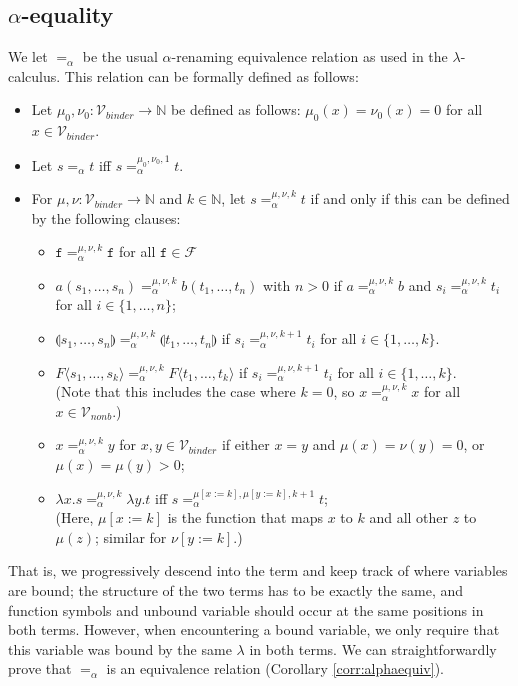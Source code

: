 \documentclass{lmcs}
\theoremstyle{theorem}\newtheorem{theorem}{Theorem}
\theoremstyle{theorem}\newtheorem{lemma}[theorem]{Lemma}
\theoremstyle{theorem}\newtheorem{corollary}[theorem]{Corollary}
\theoremstyle{definition}\newtheorem{definition}[theorem]{Definition}
\theoremstyle{definition}\newtheorem{example}[theorem]{Example}
\newcommand{\N}{\mathbb{N}}
\newcommand{\F}{\mathcal{F}}
\newcommand{\Vfree}{\mathcal{V}_{\mathit{nonb}}}
\newcommand{\Vbound}{\mathcal{V}_{\mathit{binder}}}
\newcommand{\identifier}[1]{\mathtt{#1}}
\newcommand{\afun}{\identifier{f}}
\newcommand{\avar}{x}
\newcommand{\bvar}{y}
\newcommand{\cvar}{z}
\newcommand{\ameta}{F}
\newcommand{\abs}[2]{\lambda #1.#2}
\newcommand{\meta}[2]{#1\langle#2\rangle}
\newcommand{\tuple}[2]{\llparenthesis #1,\dots,#2 \rrparenthesis}
\begin{document}
\subsection{$\alpha$-equality}
We let $=_\alpha$ be the usual $\alpha$-renaming equivalence relation as used in
the $\lambda$-calculus. This relation can be formally defined as follows:
\begin{itemize}
\item Let $\mu_0,\nu_0 : \Vbound \rightarrow \N$ be defined as follows:
  $\mu_0(\avar) = \nu_0(\avar) = 0$ for all $\avar \in \Vbound$.
\item Let $s =_\alpha t$ iff $s =_\alpha^{\mu_0,\nu_0,1} t$.
\item For $\mu,\nu : \Vbound \rightarrow \N$ and $k \in \N$, let
  $s =_\alpha^{\mu,\nu,k} t$ if and only if this can be defined by the following
  clauses:
  \begin{itemize}
  \item $\afun =_\alpha^{\mu,\nu,k} \afun$ for all $\afun \in \F$
  \item $a(s_1,\dots,s_n) =_\alpha^{\mu,\nu,k} b(t_1,\dots,t_n)$ with $n > 0$ if
    $a =_\alpha^{\mu,\nu,k} b$ and $s_i =_\alpha^{\mu,\nu,k} t_i$ for all $i \in
    \{1,\dots,n\}$;
  \item $\tuple{s_1}{s_n} =_\alpha^{\mu,\nu,k} \tuple{t_1}{t_n}$ if
    $s_i =_\alpha^{\mu,\nu,k+1} t_i$ for all $i \in \{1,\dots,k\}$.
  \item $\meta{\ameta}{s_1,\dots,s_k} =_\alpha^{\mu,\nu,k} \meta{\ameta}{t_1,
    \dots,t_k}$ if $s_i =_\alpha^{\mu,\nu,k+1} t_i$ for all $i \in \{1,\dots,
    k\}$. \\
    (Note that this includes the case where $k = 0$, so $\avar =_\alpha^{\mu,
    \nu,k} \avar$ for all $\avar \in \Vfree$.)
  \item $\avar =_\alpha^{\mu,\nu,k} \bvar$ for $\avar,\bvar \in \Vbound$ if
    either  $\avar = \bvar$ and $\mu(\avar) = \nu(\bvar) = 0$, or $\mu(\avar) =
    \mu(\bvar) > 0$;
  \item $\abs{\avar}{s} =_\alpha^{\mu,\nu,k} \abs{\bvar}{t}$ iff $s
    =_\alpha^{\mu[\avar:=k],\mu[\bvar:=k],k+1} t$; \\
    (Here, $\mu[\avar:=k]$ is the function that maps $\avar$ to $k$ and all
    other $\cvar$ to $\mu(\cvar)$; similar for $\nu[\bvar:=k]$.)
  \end{itemize}
\end{itemize}
That is, we progressively descend into the term and keep track of where
variables are bound; the structure of the two terms has to be exactly the same,
and function symbols and unbound variable should occur at the same positions in
both terms. However, when encountering a bound variable, we only require that
this variable was bound by the same $\lambda$ in both terms.  We can
straightforwardly prove that $=_\alpha$ is an equivalence relation (Corollary
\ref{corr:alphaequiv}).
\end{document}
